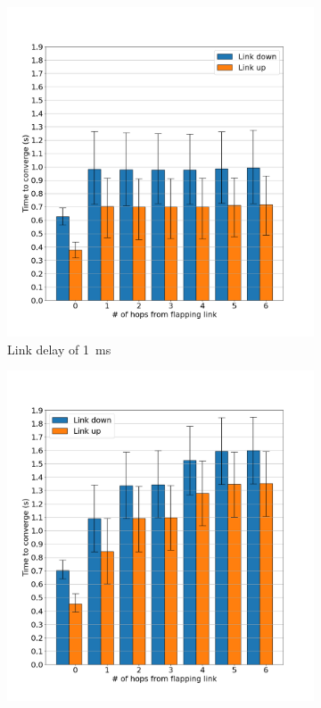 \documentclass[withindex,glossary,openany]{cam-thesis}
\begin{document}
\begin{figure}[H]
\centering
\begin{subfigure}{.5\textwidth}
  \centering
  \includegraphics[width=1\linewidth]{conv_1ms}
  \caption{Link delay of \SI{1}{\ms}}
  \label{fig:conv_1ms}
\end{subfigure}%
\begin{subfigure}{.5\textwidth}
  \centering
  \includegraphics[width=1\linewidth]{conv_100ms}

\end{subfigure}
\end{figure}
\end{document}
